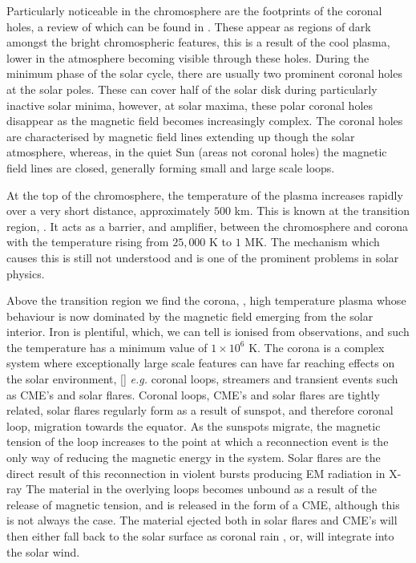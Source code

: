 Particularly noticeable in the chromosphere are the footprints of the coronal holes, a review of which can be found in \cite{Cranmer2009}.
These appear as regions of dark amongst the bright chromospheric features, this is a result of the cool plasma, lower in the atmosphere becoming visible through these holes.
During the minimum phase of the solar cycle, there are usually two prominent coronal holes at the solar poles. 
These can cover half of the solar disk during particularly inactive solar minima, however, at solar maxima, these polar coronal holes disappear as the magnetic field becomes increasingly complex.
The coronal holes are characterised by magnetic field lines extending up though the solar atmosphere, whereas, in the quiet Sun (areas not coronal holes) the magnetic field lines are closed, generally forming small and large scale loops.

At the top of the chromosphere, the temperature of the plasma increases rapidly over a very short distance, approximately $500$ km. 
This is known at the transition region, \cite{Mariska1986}.
It acts as a barrier, and amplifier, between the chromosphere and corona with the temperature rising from $25,000$ K to $1$ MK. The mechanism which causes this is still not understood and is one of the prominent problems in solar physics.

Above the transition region we find the corona, \cite{Golub2009}, high temperature plasma whose behaviour is now dominated by the magnetic field emerging from the solar interior.
Iron is plentiful, which, we can tell is ionised from observations, and such the temperature has a minimum value of $1 \times 10^6$ K.
The corona is a complex system where exceptionally large scale features can have far reaching effects on the solar environment, [\cite{Reale2014}] \emph{e.g.} coronal loops, streamers and transient events such as CME's and solar flares.
Coronal loops, CME's and solar flares are tightly related, solar flares regularly form as a result of sunspot, and therefore coronal loop, migration towards the equator.
As the sunspots migrate, the magnetic tension of the loop increases to the point at which a reconnection event is the only way of reducing the magnetic energy in the system.
Solar flares are the direct result of this reconnection in violent bursts producing EM radiation in X-ray
The material in the overlying loops becomes unbound as a result of the release of magnetic tension, and is released in the form of a CME, although this is not always the case.
The material ejected both in solar flares and CME's will then either fall back to the solar surface as coronal rain , or, will integrate into the solar wind.

